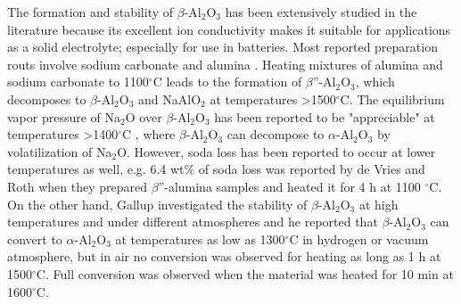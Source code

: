 The formation and stability of $\beta$-Al$_{2}$O$_{3}$ has been extensively studied in the literature because its excellent ion conductivity makes it suitable for applications as a solid electrolyte; especially for use in batteries. Most reported preparation routs involve sodium carbonate and alumina \cite{Vries1969,Kummer1972,Ray1975}. Heating mixtures of alumina and sodium carbonate to 1100$^{\circ}$C leads to the formation of $\beta$''-Al$_{2}$O$_{3}$, which decomposes to $\beta$-Al$_{2}$O$_{3}$ and NaAlO$_{2}$ at temperatures >1500$^{\circ}$C. The equilibrium vapor pressure of Na$_{2}$O over $\beta$-Al$_{2}$O$_{3}$ has been reported to be "appreciable" at temperatures >1400$^{\circ}$C \cite{Kummer1972}, where $\beta$-Al$_{2}$O$_{3}$ can decompose to $\alpha$-Al$_{2}$O$_{3}$ by volatilization of Na$_{2}$O. However, soda loss has been reported to occur at lower temperatures as well, e.g. 6.4 wt\% of soda loss was reported by de Vries and Roth \cite{Vries1969} when they prepared $\beta$''-alumina samples and heated it for 4 h at 1100 $^{\circ}$C. On the other hand, Gallup \cite{Gallup1935} investigated the stability of $\beta$-Al$_{2}$O$_{3}$ at high temperatures and under different atmospheres and he reported that $\beta$-Al$_{2}$O$_{3}$ can convert to $\alpha$-Al$_{2}$O$_{3}$ at temperatures as low as 1300$^{\circ}$C in hydrogen or vacuum atmosphere, but in air no conversion was observed for heating as long as 1 h at 1500$^{\circ}$C. Full conversion was observed when the material was heated for 10 min at 1600$^{\circ}$C.

